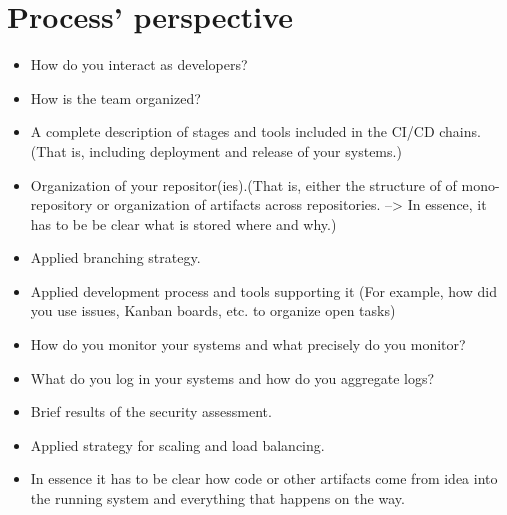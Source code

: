 \section{Process' perspective}

\begin{itemize}
  \item How do you interact as developers?
  \item How is the team organized?
  \item A complete description of stages and tools included in the CI/CD chains.(That is, including deployment and release of your systems.)
  \item Organization of your repositor(ies).(That is, either the structure of of mono-repository or organization of artifacts across repositories. --> In essence, it has to be be clear what is stored where and why.)
  \item Applied branching strategy.
  \item Applied development process and tools supporting it (For example, how did you use issues, Kanban boards, etc. to organize open tasks)
  \item How do you monitor your systems and what precisely do you monitor?
  \item What do you log in your systems and how do you aggregate logs?
  \item Brief results of the security assessment.
  \item Applied strategy for scaling and load balancing.
  \item In essence it has to be clear how code or other artifacts come from idea into the running system and everything that happens on the way.
  
\end{itemize}